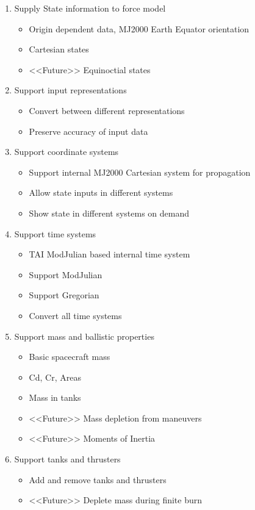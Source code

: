 \begin{enumerate}
\item Supply State information to force model
\begin{itemize}
\item Origin dependent data, MJ2000 Earth Equator orientation
\item Cartesian states
\item  <<Future>> Equinoctial states
\end{itemize}
\item  Support input representations
\begin{itemize}
\item  Convert between different representations
\item  Preserve accuracy of input data
\end{itemize}
\item Support coordinate systems
\begin{itemize}
\item  Support internal MJ2000 Cartesian system for propagation
\item  Allow state inputs in different systems
\item  Show state in different systems on demand
\end{itemize}
\item  Support time systems
\begin{itemize}
\item TAI ModJulian based internal time system
\item Support ModJulian
\item Support Gregorian
\item Convert all time systems
\end{itemize}
\item  Support mass and ballistic properties
\begin{itemize}
\item Basic spacecraft mass
\item Cd, Cr, Areas
\item Mass in tanks
\item <<Future>> Mass depletion from maneuvers
\item <<Future>> Moments of Inertia
\end{itemize}
\item  Support tanks and thrusters
\begin{itemize}
\item Add and remove tanks and thrusters
\item <<Future>> Deplete mass during finite burn

\end{itemize}
\end{enumerate}
